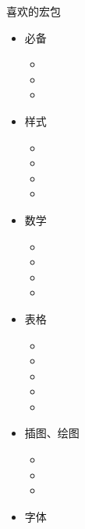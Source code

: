 \begin{frame}[fragile]{喜欢的宏包}
	\begin{multicols}{3}
		\begin{itemize}
			\item 必备

			      \begin{itemize}
				      \item {}
				      \item {}
				      \item {}
			      \end{itemize}
			\item 样式

			      \begin{itemize}
				      \item {}
				      \item {}
				      \item {}
				      \item {}
			      \end{itemize}
			\item 数学

			      \begin{itemize}
				      \item {}
				      \item {}
				      \item {}
				      \item {}
			      \end{itemize}
			\item 表格

			      \begin{itemize}
				      \item {}
				      \item {}
				      \item {}
				      \item {}
				      \item {}
			      \end{itemize}
			\item 插图、绘图

			      \begin{itemize}
				      \item {}
				      \item {}
				      \item {}
			      \end{itemize}
			\item 字体


\end{itemize}
\end{multicols}
\end{frame}
